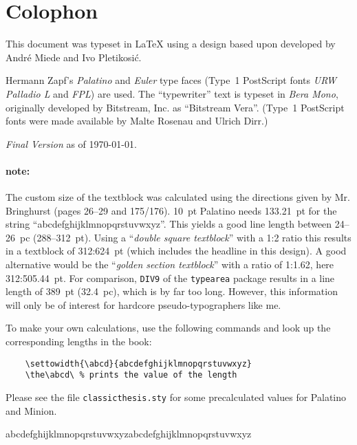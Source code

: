 \pagestyle{empty}

\hfill

\vfill


\section*{Colophon}
This document was typeset in \LaTeX{}  using a design based upon \texttt{\classicthesis} developed by Andr\'e Miede and Ivo Pletikosić.

Hermann Zapf's \emph{Palatino} and \emph{Euler} type faces (Type~1 PostScript fonts \emph{URW Palladio L} and \emph{FPL}) are used. The ``typewriter'' text is typeset in \emph{Bera Mono}, originally developed by Bitstream, Inc. as ``Bitstream Vera''. (Type~1 PostScript fonts were made available by Malte Rosenau and Ulrich Dirr.)

\bigskip

\noindent
\textit{Final Version} as of \today.




\paragraph{note:} The custom size of the textblock was calculated
using the directions given by Mr. Bringhurst (pages 26--29 and
175/176). 10~pt Palatino needs  133.21~pt for the string
``abcdefghijklmnopqrstuvwxyz''. This yields a good line length between
24--26~pc (288--312~pt). Using a ``\emph{double square textblock}''
with a 1:2 ratio this results in a textblock of 312:624~pt (which
includes the headline in this design). A good alternative would be the
``\emph{golden section textblock}'' with a ratio of 1:1.62, here
312:505.44~pt. For comparison, \texttt{DIV9} of the \texttt{typearea}
package results in a line length of 389~pt (32.4~pc), which is by far
too long. However, this information will only be of interest for
hardcore pseudo-typographers like me.%

To make your own calculations, use the following commands and look up
the corresponding lengths in the book:
\begin{verbatim}
    \settowidth{\abcd}{abcdefghijklmnopqrstuvwxyz}
    \the\abcd\ % prints the value of the length
\end{verbatim}
Please see the file \texttt{classicthesis.sty} for some precalculated
values for Palatino and Minion.

\noindent
abcdefghijklmnopqrstuvwxyzabcdefghijklmnopqrstuvwxyz
   


\newlength{\abcd}
   \settowidth{\abcd}{abcdefghijklmnopqrstuvwxyz}
\the\abcd\ %
